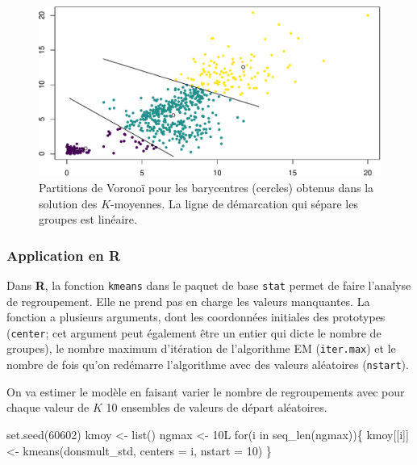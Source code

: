 \documentclass[
  11pt,
  letterpaper,
]{scrbook}
\newenvironment{Shaded}{\begin{snugshade}}{\end{snugshade}}
\newcommand{\AttributeTok}[1]{\textcolor[rgb]{0.40,0.45,0.13}{#1}}
\newcommand{\ControlFlowTok}[1]{\textcolor[rgb]{0.00,0.23,0.31}{#1}}
\newcommand{\DecValTok}[1]{\textcolor[rgb]{0.68,0.00,0.00}{#1}}
\newcommand{\FunctionTok}[1]{\textcolor[rgb]{0.28,0.35,0.67}{#1}}
\newcommand{\NormalTok}[1]{\textcolor[rgb]{0.00,0.23,0.31}{#1}}
\newcommand{\OtherTok}[1]{\textcolor[rgb]{0.00,0.23,0.31}{#1}}
\theoremstyle{definition}
\theoremstyle{remark}
\begin{document}
\begin{figure}[ht!]

{\centering \includegraphics[width=1\textwidth,height=\textheight]{./03-regroupements_files/figure-pdf/fig-voronoikmoy-1.pdf}

}

\caption{\label{fig-voronoikmoy}Partitions de Voronoï pour les
barycentres (cercles) obtenus dans la solution des \(K\)-moyennes. La
ligne de démarcation qui sépare les groupes est linéaire.}

\end{figure}

\hypertarget{application-en-r}{%
\subsubsection{\texorpdfstring{Application en
\textbf{R}}{Application en R}}\label{application-en-r}}

Dans \textbf{R}, la fonction \texttt{kmeans} dans le paquet de base
\texttt{stat} permet de faire l'analyse de regroupement. Elle ne prend
pas en charge les valeurs manquantes. La fonction a plusieurs arguments,
dont les coordonnées initiales des prototypes (\texttt{center}; cet
argument peut également être un entier qui dicte le nombre de groupes),
le nombre maximum d'itération de l'algorithme EM (\texttt{iter.max}) et
le nombre de fois qu'on redémarre l'algorithme avec des valeurs
aléatoires (\texttt{nstart}).

On va estimer le modèle en faisant varier le nombre de regroupements
avec pour chaque valeur de \(K\) 10 ensembles de valeurs de départ
aléatoires.

\begin{Shaded}
\begin{Highlighting}[]
\FunctionTok{set.seed}\NormalTok{(}\DecValTok{60602}\NormalTok{)}
\NormalTok{kmoy }\OtherTok{\textless{}{-}} \FunctionTok{list}\NormalTok{()}
\NormalTok{ngmax }\OtherTok{\textless{}{-}}\NormalTok{ 10L}
\ControlFlowTok{for}\NormalTok{(i }\ControlFlowTok{in} \FunctionTok{seq\_len}\NormalTok{(ngmax))\{}
\NormalTok{ kmoy[[i]] }\OtherTok{\textless{}{-}} \FunctionTok{kmeans}\NormalTok{(donsmult\_std,}
                     \AttributeTok{centers =}\NormalTok{ i,}
                     \AttributeTok{nstart =} \DecValTok{10}\NormalTok{)}
\NormalTok{\}}
\end{Highlighting}
\end{Shaded}
\end{document}
